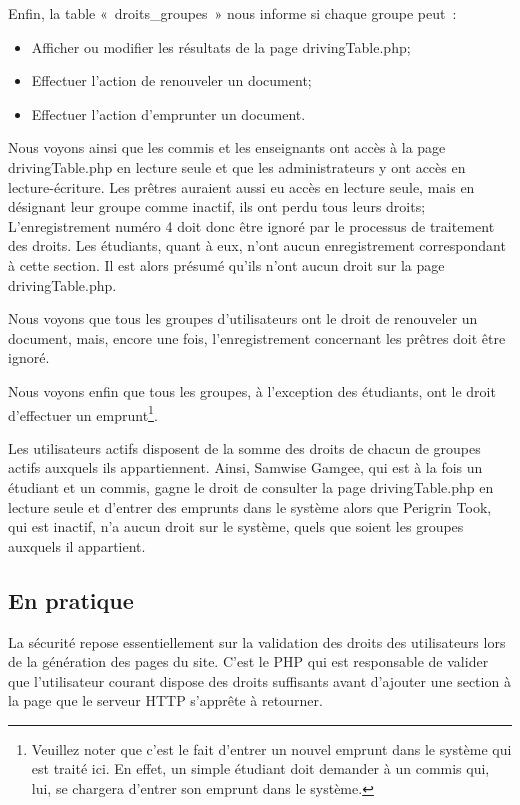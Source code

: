 \documentclass[letter, 11pt]{report}
\begin{document}
Enfin, la table «~droits\_groupes~» nous informe si chaque groupe peut~:

\begin{itemize}
	\item Afficher ou modifier les résultats de la page drivingTable.php;
	\item Effectuer l'action de renouveler un document;
	\item Effectuer l'action d'emprunter un document.
\end{itemize}

Nous voyons ainsi que les commis et les enseignants ont accès à la page drivingTable.php en lecture seule et que les administrateurs y ont accès en lecture-écriture. Les prêtres auraient aussi eu accès en lecture seule, mais en désignant leur groupe comme inactif, ils ont perdu tous leurs droits; L'enregistrement numéro 4 doit donc être ignoré par le processus de traitement des droits. Les étudiants, quant à eux, n'ont aucun enregistrement correspondant à cette section. Il est alors présumé qu'ils n'ont aucun droit sur la page drivingTable.php.

Nous voyons que tous les groupes d'utilisateurs ont le droit de renouveler un document, mais, encore une fois, l'enregistrement concernant les prêtres doit être ignoré.

Nous voyons enfin que tous les groupes, à l'exception des étudiants, ont le droit d'effectuer un emprunt\footnote{Veuillez noter que c'est le fait d'entrer un nouvel emprunt dans le système qui est traité ici. En effet, un simple étudiant doit demander à un commis qui, lui, se chargera d'entrer son emprunt dans le système.}.

Les utilisateurs actifs disposent de la somme des droits de chacun de groupes actifs auxquels ils appartiennent. Ainsi, Samwise Gamgee, qui est à la fois un étudiant et un commis, gagne le droit de consulter la page drivingTable.php en lecture seule et d'entrer des emprunts dans le système alors que Perigrin Took, qui est inactif, n'a aucun droit sur le système, quels que soient les groupes auxquels il appartient.

\subsection{En pratique}
La sécurité repose essentiellement sur la validation des droits des utilisateurs lors de la génération des pages du site. C'est le PHP qui est responsable de valider que l'utilisateur courant dispose des droits suffisants avant d'ajouter une section à la page que le serveur HTTP s’apprête à retourner.
\end{document}
